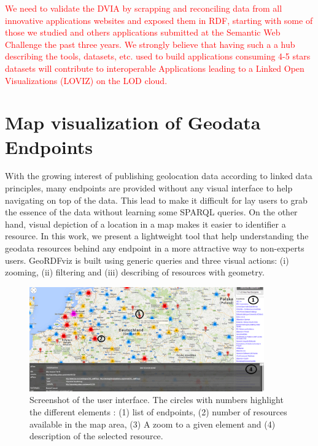 \textcolor{red}{We need to validate the DVIA by scrapping and reconciling data from all innovative applications websites and exposed them in RDF, starting with some of those we studied and others applications submitted at the Semantic Web Challenge the past three years. We strongly believe that having such a a hub  describing the tools, datasets, etc.  used to build  applications consuming 4-5 stars datasets will contribute to interoperable Applications leading to a Linked Open Visualizations (LOVIZ) on the LOD cloud.}

\section{Map visualization of Geodata Endpoints}
\label{sec:geordfviz}

With the growing interest of publishing geolocation data according to linked data principles, many endpoints are provided without any visual interface to help navigating on top of the data. This lead to make it difficult for lay users to grab the essence of the data without learning some SPARQL queries. On the other hand, visual depiction of a location in a map makes it easier to identifier a resource. In this work, we present a lightweight tool that help understanding the geodata resources behind any endpoint in a more attractive way to non-experts users. GeoRDFviz is built using generic queries and three visual actions: (i) zooming, (ii) filtering and (iii) describing of resources with geometry.

\begin{figure}[!htbp]
\begin{center}
\includegraphics[width=0.9\textwidth]{img/geoRDFvizpic_1200x.png}
\caption{Screenshot of the user interface. The circles with numbers highlight the different elements : (1) list of endpoints, (2) number of resources available in the map area, (3) A zoom to a given element and (4) description of the selected resource.}
\label{fig:geoviz-ui}
\end{center}
\end{figure}


